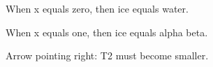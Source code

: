 When x equals zero, then ice equals water.

When x equals one, then ice equals alpha beta.

Arrow pointing right: T2 must become smaller.